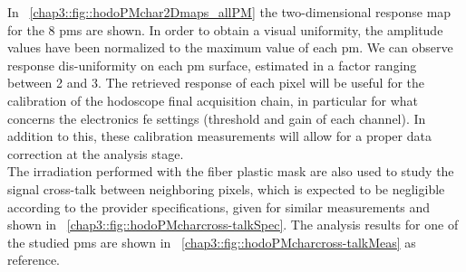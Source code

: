 In \figurename~\ref{chap3::fig::hodoPMchar2Dmaps_allPM} the two-dimensional response map for the 8 \glspl{pm} are shown. In order to obtain a visual uniformity, the amplitude values have been normalized to the maximum value of each \gls{pm}. We can observe response dis-uniformity on each \gls{pm} surface, estimated in a factor ranging between 2 and 3. The retrieved response of each pixel will be useful for the calibration of the hodoscope final acquisition chain, in particular for what concerns the electronics \gls{fe} settings (threshold and gain of each channel). In addition to this, these calibration measurements will allow for a proper data correction at the analysis stage.\\
The irradiation performed with the fiber plastic mask are also used to study the signal cross-talk between neighboring pixels, which is expected to be negligible according to the provider specifications, given for similar measurements and shown in \figurename~\ref{chap3::fig::hodoPMcharcross-talkSpec}. The analysis results for one of the studied \glspl{pm} are shown in \figurename~\ref{chap3::fig::hodoPMcharcross-talkMeas} as reference.
      
